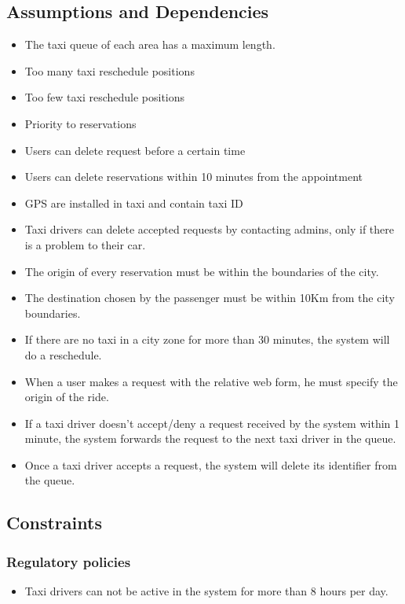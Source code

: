 \documentclass{article}
\begin{document}
	\subsection{Assumptions and Dependencies}
	    \begin{itemize}
	        \item The taxi queue of each area has a maximum length.
	        \item Too many taxi reschedule positions
	        \item Too few taxi reschedule positions
	        \item Priority to reservations
	        \item Users can delete request before a certain time
	        \item Users can delete reservations within 10 minutes from the appointment
	        \item GPS are installed in taxi and contain taxi ID
	        \item Taxi drivers can delete accepted requests by contacting admins, only if there is a problem to their car.
	        \item The origin of every reservation must be within the boundaries of the city.
    	    \item The destination chosen by the passenger must be within 10Km from the city boundaries.
	        \item If there are no taxi in a city zone for more than 30 minutes, the system will do a reschedule.
	        \item When a user makes a request with the relative web form, he must specify the origin  of the ride.
	        \item If a taxi driver doesn't accept/deny a request received by the system within 1 minute, the system forwards the request to the next taxi driver in the queue.
	        \item Once a taxi driver accepts a request, the system will delete its identifier from the queue.
        \end{itemize}
	
	\subsection{Constraints}
	    \subsubsection{Regulatory policies}
    	    \begin{itemize}
    	        \item Taxi drivers can not be active in the system for more than 8 hours per day.
    	    \end{itemize}
\end{document}
